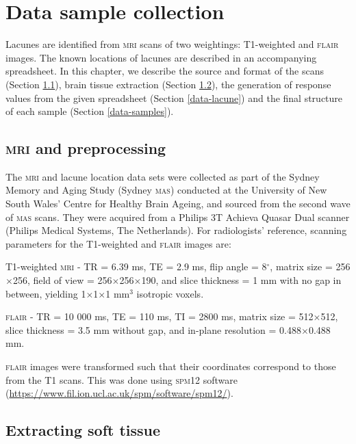


\chapter{Data sample collection}\label{data}

Lacunes are identified from \textsc{mri} scans of two weightings: T1-weighted and \textsc{flair} images. The known locations of lacunes are described in an accompanying spreadsheet. In this chapter, we describe the source and format of the scans (Section \ref{data-mri}), brain tissue extraction (Section \ref{data-soft}), the generation of response values from the given spreadsheet (Section \ref{data-lacune}) and the final structure of each sample (Section \ref{data-samples}).

\section{\textsc{mri} and preprocessing}\label{data-mri}

The \textsc{mri} and lacune location data sets were collected as part of the Sydney Memory and Aging Study (Sydney \textsc{mas}) conducted at the University of New South Wales' Centre for Healthy Brain Ageing, and sourced from the second wave of \textsc{mas} scans. They were acquired from a Philips 3T Achieva Quasar Dual scanner (Philips Medical Systems, The Netherlands). For radiologists' reference, scanning parameters for the T1-weighted and \textsc{flair} images are:

T1-weighted \textsc{mri} - TR = 6.39 ms, TE = 2.9 ms, flip angle = 8$^\circ$, matrix size = 256$\times$256, field of view = 256$\times$256$\times$190, and slice thickness = 1 mm with no gap in between, yielding 1$\times$1$\times$1 mm$^3$ isotropic voxels.

\textsc{flair} - TR = 10 000 ms, TE = 110 ms, TI = 2800 ms, matrix size = 512$\times$512, slice thickness = 3.5 mm without gap, and in-plane resolution = 0.488$\times$0.488 mm.

\textsc{flair} images were transformed such that their coordinates correspond to those from the T1 scans. This was done using \textsc{spm12} software (\url{https://www.fil.ion.ucl.ac.uk/spm/software/spm12/}).

\section{Extracting soft tissue}\label{data-soft}

